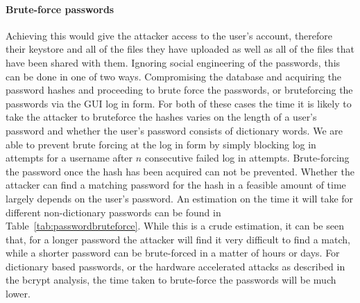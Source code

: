 \documentclass[12pt, titlepage]{article}
\begin{document}
\paragraph*{Brute-force passwords} Achieving this would give the attacker access to the user's account, therefore their keystore and all of the files they have uploaded as well as all of the files that have been shared with them. Ignoring social engineering of the passwords, this can be done in one of two ways. Compromising the database and acquiring the password hashes and proceeding to brute force the passwords, or bruteforcing the passwords via the GUI log in form. For both of these cases the time it is likely to take the attacker to bruteforce the hashes varies on the length of a user's password and whether the user's password consists of dictionary words. We are able to prevent brute forcing at the log in form by simply blocking log in attempts for a username after $n$ consecutive failed log in attempts. Brute-forcing the password once the hash has been acquired can not be prevented. Whether the attacker can find a matching password for the hash in a feasible amount of time largely depends on the user's password. An estimation on the time it will take for different non-dictionary passwords can be found in Table~\ref{tab:passwordbruteforce}. While this is a crude estimation, it can be seen that, for a longer password the attacker will find it very difficult to find a match, while a shorter password can be brute-forced in a matter of hours or days. For dictionary based passwords, or the hardware accelerated attacks as described in the bcrypt analysis, the time taken to brute-force the passwords will be much lower.
\end{document}
